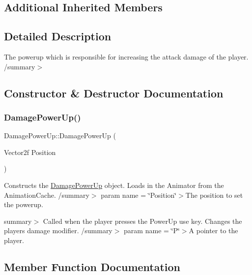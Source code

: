 \subsection*{Additional Inherited Members}


\subsection{Detailed Description}
The powerup which is responsible for increasing the attack damage of the player. /summary$>$ 

\subsection{Constructor \& Destructor Documentation}
\mbox{\label{class_engine_1_1_game_play_1_1_damage_power_up_a25af42480a9ce9eedbb82e1be666891c}} 
\subsubsection{\texorpdfstring{Damage\+Power\+Up()}{DamagePowerUp()}}
{\footnotesize\ttfamily Damage\+Power\+Up\+::\+Damage\+Power\+Up (\begin{DoxyParamCaption}\item[{Vector2f}]{Position }\end{DoxyParamCaption})}



Constructs the \hyperlink{class_engine_1_1_game_play_1_1_damage_power_up}{Damage\+Power\+Up} object. Loads in the Animator from the Animation\+Cache. /summary$>$ param name = \char`\"{}\+Position\char`\"{}$>$The position to set the powerup.

summary$>$ Called when the player presses the Power\+Up use key. Changes the players damage modifier. /summary$>$ param name = \char`\"{}\+P\char`\"{}$>$A pointer to the player.

\subsection{Member Function Documentation}
\mbox{\label{class_engine_1_1_game_play_1_1_damage_power_up_abadfb61b67dd580bc98d7e120c2809cd}} 
